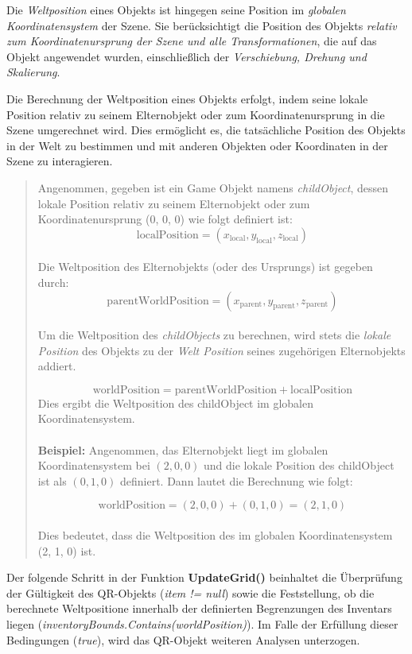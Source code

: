 Die \textit{Weltposition} eines Objekts ist hingegen seine Position im \textit{globalen Koordinatensystem} der Szene.
Sie berücksichtigt die Position des Objekts \textit{relativ zum Koordinatenursprung der Szene und alle Transformationen},
die auf das Objekt angewendet wurden, einschließlich der \textit{Verschiebung, Drehung und Skalierung}.

Die Berechnung der Weltposition eines Objekts erfolgt, indem seine lokale Position relativ zu seinem Elternobjekt oder zum
Koordinatenursprung in die Szene umgerechnet wird. Dies ermöglicht es, die tatsächliche Position des Objekts in der Welt
zu bestimmen und mit anderen Objekten oder Koordinaten in der Szene zu interagieren.
\begin{quote}
Angenommen, gegeben ist ein Game Objekt namens \textit{childObject}, dessen lokale Position relativ zu seinem Elternobjekt
oder zum Koordinatenursprung (0, 0, 0) wie folgt definiert ist:
\[
\text{localPosition} = (x_{\text{local}}, y_{\text{local}}, z_{\text{local}})
\]
\\
Die Weltposition des Elternobjekts (oder des Ursprungs) ist gegeben durch:
\[
\text{parentWorldPosition} = (x_{\text{parent}}, y_{\text{parent}}, z_{\text{parent}})
\]
\\
Um die Weltposition des \textit{childObjects} zu berechnen, wird stets die \textit{lokale Position} des Objekts zu der
\textit{Welt Position} seines zugehörigen Elternobjekts addiert.

\[
\text{worldPosition} = \text{parentWorldPosition} + \text{localPosition}
\]
Dies ergibt die Weltposition des childObject im globalen Koordinatensystem.
\\
\\
\textbf{Beispiel:}
Angenommen, das Elternobjekt liegt im globalen Koordinatensystem bei $(2, 0, 0)$ und die lokale Position des childObject
ist als $(0, 1, 0)$ definiert. Dann lautet die Berechnung wie folgt:

\[
\text{worldPosition} = (2, 0, 0) + (0, 1, 0) = (2, 1, 0)
\]
\\
Dies bedeutet, dass die Weltposition des  im globalen Koordinatensystem (2, 1, 0) ist.\\
\end{quote}

Der folgende Schritt in der Funktion \textbf{UpdateGrid()} beinhaltet die Überprüfung der Gültigkeit des QR-Objekts
(\textit{item != null}) sowie die Feststellung, ob die berechnete Weltpositione innerhalb der definierten Begrenzungen
des Inventars liegen (\textit{inventoryBounds.Contains(worldPosition)}). Im Falle der Erfüllung dieser Bedingungen
(\textit{true}), wird das QR-Objekt weiteren Analysen unterzogen.

